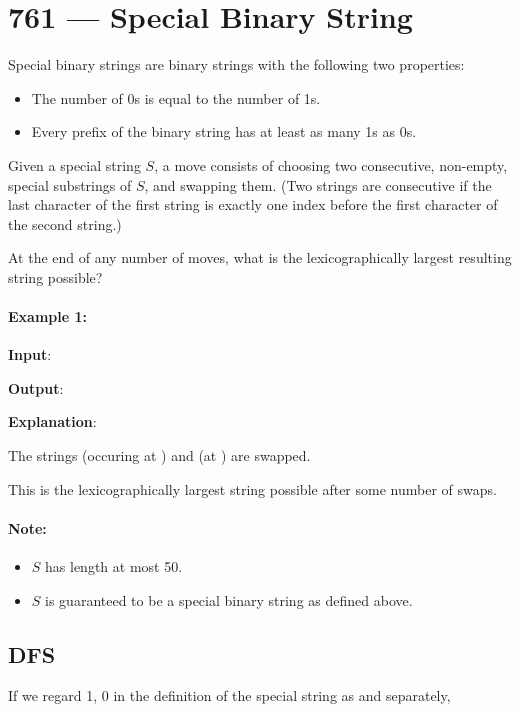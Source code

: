 \section{761 --- Special Binary String}
Special binary strings are binary strings with the following two properties:

\begin{itemize}
\item The number of 0s is equal to the number of 1s.
\item Every prefix of the binary string has at least as many 1s as 0s.
\end{itemize}

Given a special string $S$, a move consists of choosing two consecutive, non-empty, special substrings of $S$, and swapping them. (Two strings are consecutive if the last character of the first string is exactly one index before the first character of the second string.)

At the end of any number of moves, what is the lexicographically largest resulting string possible?

\paragraph{Example 1:}

\begin{flushleft}
\textbf{Input}: 

\textbf{Output}: 

\textbf{Explanation}:

The strings  (occuring at ) and  (at ) are swapped.

This is the lexicographically largest string possible after some number of swaps.
\end{flushleft}

\paragraph{Note:}

\begin{itemize}
\item $S$ has length at most 50.
\item $S$ is guaranteed to be a special binary string as defined above.
\end{itemize}

\subsection{DFS}
If we regard 1, 0 in the definition of the special string as  and  separately,


